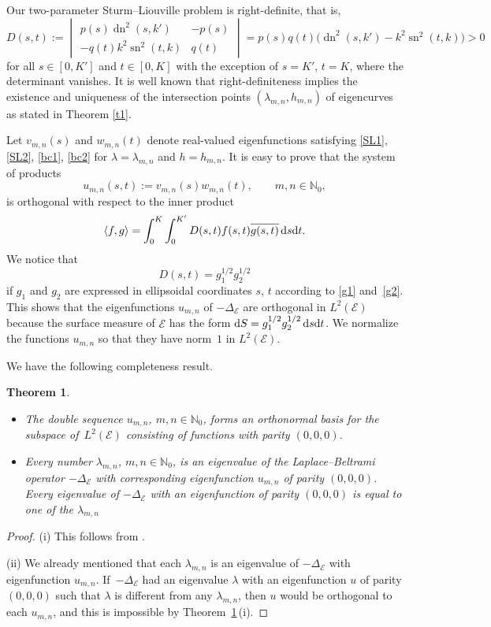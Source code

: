\documentclass[10pt,a4paper]{amsart}
\newtheorem{thm}{Theorem}[section]
\newcommand{\N}{\mathbb{N}}
\newcommand{\E}{\mathcal{E}}
\newcommand{\D}{\Delta_\E}
\DeclareMathOperator{\sn}{sn}
\DeclareMathOperator{\dn}{dn}
\numberwithin{equation}{section}
\begin{document}
Our two-parameter Sturm--Liouville problem is right-definite, that is,
\setlength{\arraycolsep}{1mm}
\[ D(s,t):=\begin{vmatrix} p(s)\dn^2(s,k') & -p(s) \\ -q(t) k^2\sn^2(t,k) & q(t)\end{vmatrix}=p(s)q(t)\bigl(\dn^2(s,k')-k^2\sn^2(t,k)\bigr)>0 \]
for all $s\in[0,K']$ and $t\in[0,K]$ with the exception of $s=K'$, $t=K$, where the determinant vanishes.
It is well known \cite[Theorem 5.5.1]{AM} that right-definiteness implies the existence and uniqueness of the intersection points $(\lambda_{m,n},h_{m,n})$ of eigencurves as stated in Theorem \ref{t1}.

Let $v_{m,n}(s)$ and $w_{m,n}(t)$ denote real-valued eigenfunctions
satisfying \eqref{SL1}, \eqref{SL2}, \eqref{bc1}, \eqref{bc2} for $\lambda=\lambda_{m,n}$ and $h=h_{m,n}$.
It is easy to prove \cite[Section 3.5]{AM} that the system
of products
\[ u_{m,n}(s,t):=v_{m,n}(s)w_{m,n}(t),\qquad m,n\in\N_0,\]
is orthogonal with respect to the
inner product
\[
\langle f,g\rangle=\int_0^K \int_0^{K'} D(s,t) f(s,t)\overline{g(s,t)}\,{\rm d}s{\rm d}t.
\]
We notice that
\[ D(s,t)=g_1^{1/2}g_2^{1/2} \]
if $g_1$ and $g_2$ are expressed in ellipsoidal coordinates $s$, $t$ according to \eqref{g1} and~\eqref{g2}.
This shows that the eigenfunctions $u_{m,n}$ of $-\D$ are orthogonal
in $L^2(\E)$ because the surface measure of $\E$ has the form ${\rm d}S =g_1^{1/2}g_2^{1/2}\,{\rm d}s {\rm d}t$.
We normalize the functions $u_{m,n}$ so that they have norm~$1$ in $L^2(\E)$.

We have the following completeness result.


\begin{thm}\label{t2}\quad
\begin{itemize}\itemsep=0pt
\item[$(i)$] The double sequence $u_{m,n}$, $m,n\in\N_0$,
forms an orthonormal basis for the subspace of~$L^2(\E)$ consisting of functions with parity $(0,0,0)$.

\item[$(ii)$]
Every number $\lambda_{m,n}$, $m,n\in\N_0$, is an eigenvalue of the Laplace--Beltrami operator $-\D$
with corresponding eigenfunction $u_{m,n}$ of parity $(0,0,0)$.
Every eigenvalue of $-\D$ with an eigenfunction of parity $(0,0,0)$ is equal to one of the $\lambda_{m,n}$
\end{itemize}
\end{thm}

\begin{proof}
(i) This follows from \cite[Theorem 6.8.3]{Vbook}.

(ii)
We already mentioned that each $\lambda_{m,n}$ is an eigenvalue of $-\D$ with eigenfunction $u_{m,n}$.
If~$-\D$ had an eigenvalue $\lambda$ with an eigenfunction $u$ of parity $(0,0,0)$ such that
$\lambda$ is different from any $\lambda_{m,n}$, then $u$ would be orthogonal to each $u_{m,n}$, and this is impossible by
Theorem~\ref{t2}\,(i).
\end{proof}
\end{document}
